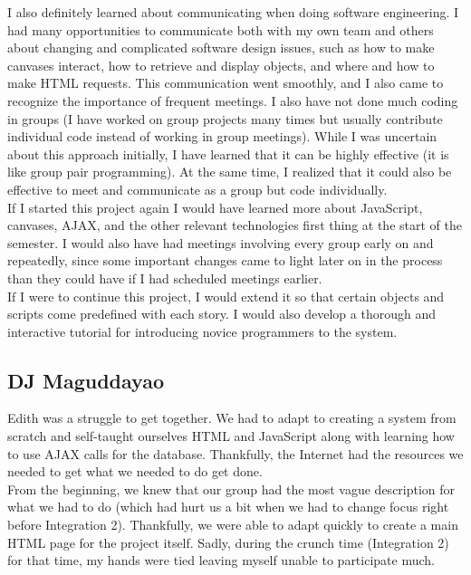 \documentclass[12pt]{article}
\begin{document}
I also definitely learned about communicating when doing software engineering. I had many opportunities to communicate both with my own team and others about changing and complicated software design issues, such as how to make canvases interact, how to retrieve and display objects, and where and how to make HTML requests. This communication went smoothly, and I also came to recognize the importance of frequent meetings. I also have not done much coding in groups (I have worked on group projects many times but usually contribute individual code instead of working in group meetings). While I was uncertain about this approach initially, I have learned that it can be highly effective (it is like group pair programming). At the same time, I realized that it could also be effective to meet and communicate as a group but code individually. \\

If I started this project again I would have learned more about JavaScript, canvases, AJAX, and the other relevant technologies first thing at the start of the semester. I would also have had meetings involving every group early on and repeatedly, since some important changes came to light later on in the process than they could have if I had scheduled meetings earlier. \\

If I were to continue this project, I would extend it so that certain objects and scripts come predefined with each story. I would also develop a thorough and interactive tutorial for introducing novice programmers to the system. 

\subsection{DJ Maguddayao}
Edith was a struggle to get together.  We had to adapt to creating a system from scratch and self-taught ourselves HTML and JavaScript along with learning how to use AJAX calls for the database.  Thankfully, the Internet had the resources we needed to get what we needed to do get done. \\

From the beginning, we knew that our group had the most vague description for what we had to do (which had hurt us a bit when we had to change focus right before Integration 2).  Thankfully, we were able to adapt quickly to create a main HTML page for the project itself.  Sadly, during the crunch time (Integration 2) for that time, my hands were tied leaving myself unable to participate much. \\
\end{document}
